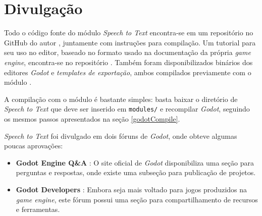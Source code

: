 
\section{Divulgação}
\label{modulePublishing}

Todo o código fonte do módulo \textit{Speech to Text} encontra-se em um repositório no GitHub do autor \citep{sttModuleGitHub}, juntamente com instruções para compilação. Um tutorial para seu uso no editor, baseado no formato usado na documentação da própria \textit{game engine}, encontra-se no repositório \citep{sttModuleTutorial}. Também foram disponibilizados binários dos editores \textit{Godot} e \textit{templates de exportação}, ambos compilados previamente com o módulo \citep{sttModuleDownload}.

A compilação com o módulo é bastante simples: basta baixar o diretório de \textit{Speech to Text} que deve ser inserido em \texttt{modules/} e recompilar \textit{Godot}, seguindo os mesmos passos apresentados na seção \ref{godotCompile}.

\textit{Speech to Text} foi divulgado em dois fóruns de \textit{Godot}, onde obteve algumas poucas aprovações:

\begin{itemize}
\item \textbf{Godot Engine Q\&A} \citep{sttModuleGodotQA}: O site oficial de \textit{Godot} disponibiliza uma seção para perguntas e respostas, onde existe uma subseção para publicação de projetos.

\item \textbf{Godot Developers} \citep{sttModuleGodotDevelopers}: Embora seja mais voltado para jogos produzidos na \textit{game engine}, este fórum possui uma seção para compartilhamento de recursos e ferramentas.
\end{itemize}
